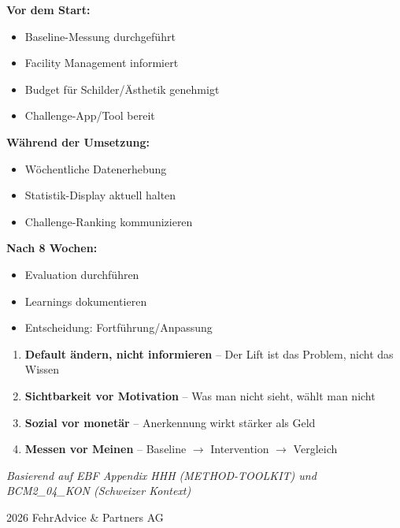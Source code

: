 \documentclass[11pt,a4paper]{article}
\begin{document}
\begin{tcolorbox}[keymessage={Checkliste für das Projektteam}]
\textbf{Vor dem Start:}
\begin{itemize}
    \item[$\square$] Baseline-Messung durchgeführt
    \item[$\square$] Facility Management informiert
    \item[$\square$] Budget für Schilder/Ästhetik genehmigt
    \item[$\square$] Challenge-App/Tool bereit
\end{itemize}

\textbf{Während der Umsetzung:}
\begin{itemize}
    \item[$\square$] Wöchentliche Datenerhebung
    \item[$\square$] Statistik-Display aktuell halten
    \item[$\square$] Challenge-Ranking kommunizieren
\end{itemize}

\textbf{Nach 8 Wochen:}
\begin{itemize}
    \item[$\square$] Evaluation durchführen
    \item[$\square$] Learnings dokumentieren
    \item[$\square$] Entscheidung: Fortführung/Anpassung
\end{itemize}
\end{tcolorbox}

\begin{tcolorbox}[keymessage={Die wichtigsten Prinzipien}]
\begin{enumerate}
    \item \textbf{Default ändern, nicht informieren} -- Der Lift ist das Problem, nicht das Wissen
    \item \textbf{Sichtbarkeit vor Motivation} -- Was man nicht sieht, wählt man nicht
    \item \textbf{Sozial vor monetär} -- Anerkennung wirkt stärker als Geld
    \item \textbf{Messen vor Meinen} -- Baseline $\rightarrow$ Intervention $\rightarrow$ Vergleich
\end{enumerate}
\end{tcolorbox}

\vfill

\begin{center}
\textit{Basierend auf EBF Appendix HHH (METHOD-TOOLKIT) und BCM2\_04\_KON (Schweizer Kontext)}

\vspace{0.5cm}

\textcopyright{} 2026 FehrAdvice \& Partners AG
\end{center}
\end{document}
